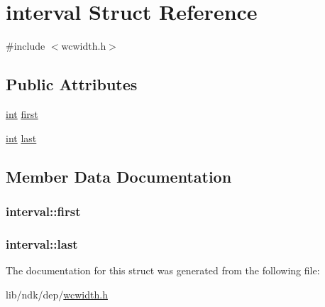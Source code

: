 \hypertarget{structinterval}{\section{interval Struct Reference}
\label{structinterval}
}


{\ttfamily \#include $<$wcwidth.\-h$>$}

\subsection*{Public Attributes}
\begin{DoxyCompactItemize}
\item 
\hyperlink{term__entry_8h_ad65b480f8c8270356b45a9890f6499ae}{int} \hyperlink{structinterval_abf2f6b69412c1dbfb293ba62333389fc}{first}
\item 
\hyperlink{term__entry_8h_ad65b480f8c8270356b45a9890f6499ae}{int} \hyperlink{structinterval_a175bdecc69f76d36c52afb0354e080de}{last}
\end{DoxyCompactItemize}


\subsection{Member Data Documentation}
\hypertarget{structinterval_abf2f6b69412c1dbfb293ba62333389fc}{
\subsubsection[{first}]{ interval\-::first}}\label{structinterval_abf2f6b69412c1dbfb293ba62333389fc}
\hypertarget{structinterval_a175bdecc69f76d36c52afb0354e080de}{
\subsubsection[{last}]{ interval\-::last}}\label{structinterval_a175bdecc69f76d36c52afb0354e080de}


The documentation for this struct was generated from the following file\-:\begin{DoxyCompactItemize}
\item 
lib/ndk/dep/\hyperlink{wcwidth_8h}{wcwidth.\-h}\end{DoxyCompactItemize}
